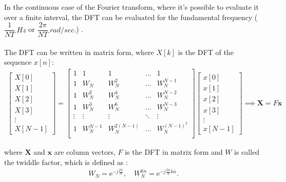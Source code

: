 In the continuous case of the Fourier transform, where it's possible to evaluate it over a finite interval, the DFT can be evaluated for the fundamental frequency ($\dfrac{1}{NT} \ Hz$ or $\dfrac{2\pi}{NT} \ rad/sec.$) \cite{DFT_OX} .
%
\\ \\
The DFT can be written in matrix form, where $X[k]$ is the DFT of the sequence $x[n]$:
\begin{align} \label{eq:DFT_matrix}
	\begin{bmatrix}
		X[0]\\ X[1]\\ X[2]\\ X[3] \\ \vdots \\ X[N-1]
	\end{bmatrix}
	=
	\begin{bmatrix}
		1 & 1 	& 1   	& \hdots & 1\\
		1 & W_N 	& W_N^2 	& \hdots & W_N^{N-1} \\
		1 & W_N^2	& W_N^4	& \hdots & W_N^{N-2} \\
		1 & W_N^3	& W_N^6	& \hdots & W_N^{N-3} \\
		\vdots & \vdots & \vdots & \ddots & \vdots \\
		1 & W_N^{N-1}	& W_N^{2(N-1)}	& \hdots & 						W_N^{(N-1)^2} \\
	\end{bmatrix}
	\begin{bmatrix}
		x[0]\\ x[1]\\ x[2]\\ x[3]\\ \vdots \\ x[N-1]
	\end{bmatrix} 
	\implies
	\textbf{X} = F\textbf{x}
\end{align}

where $\textbf{X}$ and $\textbf{x}$ are column vectors, $F$ is the DFT in matrix form and $W$ is called the twiddle factor, which is defined as \cite{DFT_OX}:
\begin{align*}
	W_N = \text{e}^{-j\frac{2 \pi}{N}}, \quad W_N^{kn} = \text{e}^{-j\frac{2 \pi}{N}kn}.
\end{align*}

